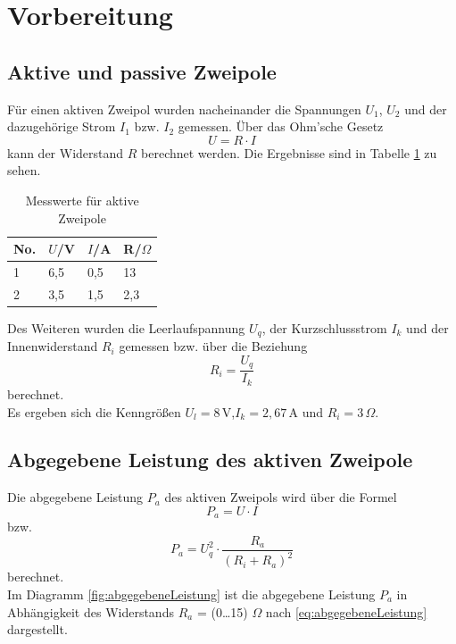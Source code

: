 \section{Vorbereitung}

\subsection{Aktive und passive Zweipole}

Für einen aktiven Zweipol wurden nacheinander die Spannungen $U_1$, $U_2$ und der dazugehörige Strom $I_1$ bzw. $I_2$ gemessen.
Über das Ohm'sche Gesetz
\begin{equation*}
    \label{eq:ohmschesGesetz}
    U=R\cdot I
\end{equation*} kann der Widerstand $R$ berechnet werden. Die Ergebnisse sind in Tabelle \ref{tab:aktiveZweipole} zu sehen.
\begin{center}
    \begin{table}[ht]
        \begin{tabularx}{\linewidth}{|*{4}{X|}}
            \hline
            No. & $U$/V & $I$/A & R/${\Omega}$ \\
            \hline
            1   & 6,5   & 0,5   & 13           \\
            2   & 3,5   & 1,5   & 2,3          \\
            \hline
        \end{tabularx}
        \caption{Messwerte für aktive Zweipole}
        \label{tab:aktiveZweipole}
    \end{table}
\end{center}
Des Weiteren wurden die Leerlaufspannung $U_q$, der Kurzschlussstrom $I_k$ und der Innenwiderstand $R_i$ gemessen bzw. über die Beziehung
\begin{equation*}
    \label{eq:innenwiderstand}
    R_i=\frac{U_q}{I_k}
\end{equation*} berechnet.\\
Es ergeben sich die Kenngrößen $U_l=8\,$V,$I_k=2,67\,$A und $R_i=3\,\Omega$.

\subsection{Abgegebene Leistung des aktiven Zweipole}
Die abgegebene Leistung $P_a$ des aktiven Zweipols wird über die Formel
\begin{equation}
    \label{eq:abgegebeneLeistungAllgemein}
    P_a=U\cdot I
\end{equation}
bzw.
\begin{equation}
    \label{eq:abgegebeneLeistung}
    P_a=U_q^{2}\cdot{\frac{R_a}{(R_i+R_a)^2}}
\end{equation}
berechnet.\\
Im Diagramm \ref{fig:abgegebeneLeistung} ist die abgegebene Leistung $P_a$ in Abhängigkeit des Widerstands $R_a$ = (0\dots15) $\Omega$ nach \eqref{eq:abgegebeneLeistung} dargestellt.

